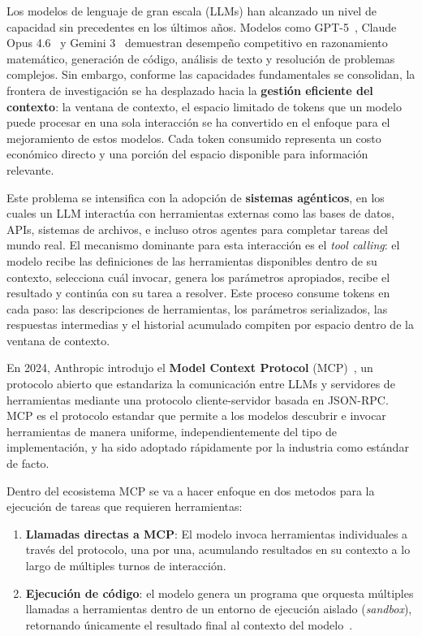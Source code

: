\documentclass[runningheads]{llncs}
\begin{document}
Los modelos de lenguaje de gran escala (LLMs) han alcanzado un nivel de
capacidad sin precedentes en los \'ultimos a\~nos. Modelos como GPT-5~\cite{ref_gpt5},
Claude Opus 4.6~\cite{ref_opus} y Gemini 3~\cite{ref_gemini3} demuestran
desempe\~no competitivo en razonamiento matem\'atico, generaci\'on de c\'odigo,
an\'alisis de texto y resoluci\'on de problemas complejos. Sin embargo, conforme
las capacidades fundamentales se consolidan, la frontera de investigaci\'on se
ha desplazado hacia la \textbf{gesti\'on eficiente del contexto}: la ventana de
contexto, el espacio limitado de tokens que un modelo puede procesar en una
sola interacci\'on se ha convertido en el enfoque para el mejoramiento de estos modelos. Cada token consumido representa un costo econ\'omico
directo y una porci\'on del
espacio disponible para informaci\'on relevante.

Este problema se intensifica con la adopci\'on de \textbf{sistemas ag\'enticos},
en los cuales un LLM interact\'ua con herramientas externas como las bases de datos,
APIs, sistemas de archivos, e incluso otros agentes  para completar tareas del mundo real. El mecanismo
dominante para esta interacci\'on es el \textit{tool calling}: el modelo recibe
las definiciones de las herramientas disponibles dentro de su contexto,
selecciona cu\'al invocar, genera los par\'ametros apropiados, recibe el resultado
y contin\'ua con su tarea a resolver. Este proceso consume tokens en cada paso: las
descripciones de herramientas, los par\'ametros serializados, las respuestas
intermedias y el historial acumulado compiten por espacio dentro de la ventana
de contexto.

En 2024, Anthropic introdujo el \textbf{Model Context Protocol} (MCP)~\cite{ref_mcp},
un protocolo abierto que estandariza la comunicaci\'on entre LLMs y servidores de
herramientas mediante una protocolo cliente-servidor basada en JSON-RPC. MCP es el protocolo estandar
que permite a los modelos descubrir e invocar herramientas de manera uniforme,
independientemente del tipo de implementaci\'on, y ha sido adoptado
r\'apidamente por la industria como est\'andar de facto.

Dentro del ecosistema MCP se va a hacer enfoque en dos metodos para la ejecuci\'on de
tareas que requieren herramientas:

\begin{enumerate}
    \item \textbf{Llamadas directas a MCP}: El modelo invoca herramientas
    individuales a trav\'es del protocolo, una por una, acumulando resultados en
    su contexto a lo largo de m\'ultiples turnos de interacci\'on.

    \item \textbf{Ejecuci\'on de c\'odigo}: el modelo genera un programa que
    orquesta m\'ultiples llamadas a herramientas dentro de un entorno de
    ejecuci\'on aislado (\textit{sandbox}), retornando \'unicamente el resultado
    final al contexto del modelo~\cite{ref_codeexec}.
\end{enumerate}
\end{document}
